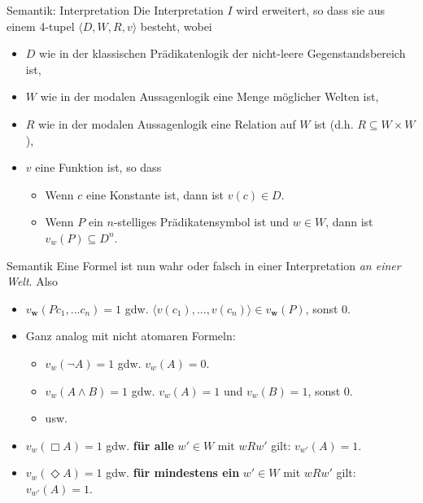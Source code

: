 \documentclass[12pt]{beamer}
\begin{document}
\begin{frame}{Semantik: Interpretation}
  Die Interpretation $I$ wird erweitert, so dass sie aus einem 4-tupel
  $\langle D, W, R, v \rangle$ besteht, wobei \pause
  \begin{itemize}[<+->]
  \item $D$ wie in der klassischen Prädikatenlogik der nicht-leere
    Gegenstandsbereich ist,
  \item $W$ wie in der modalen Aussagenlogik eine Menge möglicher
    Welten ist,
  \item $R$ wie in der modalen Aussagenlogik eine Relation auf $W$ ist
    (d.h. $R \subseteq W \times W$),
  \item $v$ eine Funktion ist, so dass
    \begin{itemize}
    \item Wenn $c$ eine Konstante ist, dann ist $v(c) \in D$.
    \item Wenn $P$ ein $n$-stelliges Prädikatensymbol ist und
      $w \in W$, dann ist $v_w(P) \subseteq D^n$.
    \end{itemize}
  \end{itemize}
\end{frame}

\begin{frame}{Semantik}
  Eine Formel ist nun wahr oder falsch in einer Interpretation
  \emph{an einer Welt}.  Also
  \begin{itemize}[<+->]
  \item $v_\mathbf{w}(Pc_1,...c_n) = 1$ gdw.
    $\langle v(c_1),...,v(c_n)\rangle \in v_\mathbf{w}(P)$, sonst 0.
  \item Ganz analog mit nicht atomaren Formeln:
    \begin{itemize}
    \item $v_w(\neg A) = 1$ gdw. $v_w(A) = 0$.
    \item $v_w(A \land B) = 1$ gdw. $v_w(A) = 1$ und $v_w(B) = 1$,
      sonst 0.
    \item usw.
    \end{itemize}
  \item $v_w(\Box A) = 1$ gdw. \textbf{für alle} $w' \in W$ mit $wRw'$
    gilt: $v_{w'}(A) = 1$.
  \item $v_w(\Diamond A) = 1$ gdw. \textbf{für mindestens ein}
    $w' \in W$ mit $wRw'$ gilt: $v_{w'}(A) = 1$.
  \end{itemize}
\end{frame}
\end{document}
